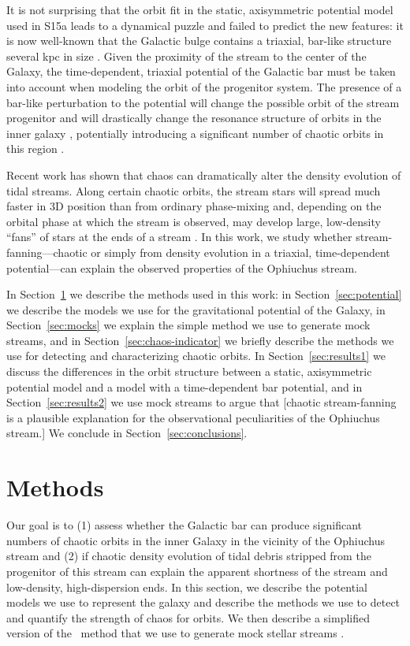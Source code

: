 \documentclass[letterpaper,12pt,preprint]{aastex}
\begin{document}
It is not surprising that the orbit fit in the static, axisymmetric potential model used in S15a leads to a dynamical puzzle and failed to predict the new features: it is now well-known that the Galactic bulge contains a triaxial, bar-like structure several kpc in size \citep[e.g.,][]{blitzXX, wegg13, MANY}. Given the proximity of the stream to the center of the Galaxy, the time-dependent, triaxial potential of the Galactic bar must be taken into account when modeling the orbit of the progenitor system. The presence of a bar-like perturbation to the potential will change the possible orbit of the stream progenitor and will drastically change the resonance structure of orbits in the inner galaxy \citep{athanassoula, portail15b MANY}, potentially introducing a significant number of chaotic orbits in this region \citep{weinberg15}.

Recent work has shown that chaos can dramatically alter the density evolution of tidal streams. Along certain chaotic orbits, the stream stars will spread much faster in 3D position than from ordinary phase-mixing and, depending on the orbital phase at which the stream is observed, may develop large, low-density ``fans'' of stars at the ends of a stream \citep{apw15-chaos}. In this work, we study whether stream-fanning---chaotic or simply from density evolution in a triaxial, time-dependent potential---can explain the observed properties of the Ophiuchus stream. 

In Section~\ref{sec:method} we describe the methods used in this work: in Section~\ref{sec:potential} we describe the models we use for the gravitational potential of the Galaxy, in Section~\ref{sec:mocks} we explain the simple method we use to generate mock streams, and in Section~\ref{sec:chaos-indicator} we briefly describe the methods we use for detecting and characterizing chaotic orbits. In Section~\ref{sec:results1} we discuss the differences in the orbit structure between a static, axisymmetric potential model and a model with a time-dependent bar potential, and in Section~\ref{sec:results2} we use mock streams to argue that [chaotic stream-fanning is a plausible explanation for the observational peculiarities of the Ophiuchus stream.] We conclude in Section~\ref{sec:conclusions}.

\section{Methods}\label{sec:method}

Our goal is to (1) assess whether the Galactic bar can produce significant numbers of chaotic orbits in the inner Galaxy in the vicinity of the Ophiuchus stream and (2) if chaotic density evolution of tidal debris stripped from the progenitor of this stream can explain the apparent shortness of the stream and low-density, high-dispersion ends. In this section, we describe the potential models we use to represent the galaxy and describe the methods we use to detect and quantify the strength of chaos for orbits. We then describe a simplified version of the \streakline\ method that we use to generate mock stellar streams \citep{kuepper12}. 
\end{document}
